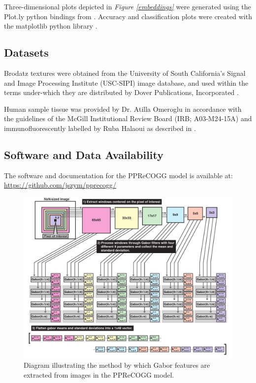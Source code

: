 Three-dimensional plots depicted in \textit{Figure \ref{embeddings}} were generated using the Plot.ly python bindings from \cite{plotly}. Accuracy and classification plots were created with the \mbox{matplotlib} python library \citep{hunter2007}.\par

\subsection{Datasets}
Brodatz textures were obtained from the University of South California's Signal and Image Processing Institute (USC-SIPI) image database, and used within the terms under-which they are distributed by Dover Publications, Incorporated \citep{brodatz1999}.\par

Human sample tissue was provided by Dr. Atilla Omeroglu in accordance with the guidelines of the McGill Institutional Review Board (IRB; A03-M24-15A) and immunofluorescently labelled by Ruba Halaoui as described in \citep{halaoui2017}.\par

\subsection{Software and Data Availability}

The software and documentation for the PPReCOGG model is available at:\\ \url{https://github.com/jszym/pprecogg/}

\begin{landscape}
	\begin{figure}[ht!]
		\centering
		\includegraphics[width=190mm]{figures/gabor-kmknn-figure2.pdf}
		\caption{Diagram illustrating the method by which Gabor features are extracted from images in the PPReCOGG model. \label{gabor_diagram}}
	\end{figure}
\end{landscape}

